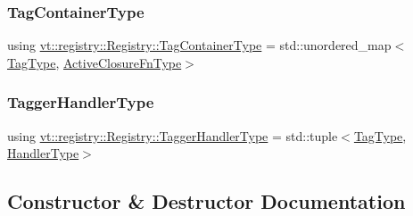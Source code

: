 \mbox{\label{structvt_1_1registry_1_1_registry_abefc9cdcc8557c5d547dd3ae44ae0996}} 
\subsubsection{\texorpdfstring{Tag\+Container\+Type}{TagContainerType}}
{\footnotesize\ttfamily using \hyperlink{structvt_1_1registry_1_1_registry_abefc9cdcc8557c5d547dd3ae44ae0996}{vt\+::registry\+::\+Registry\+::\+Tag\+Container\+Type} =  std\+::unordered\+\_\+map$<$\hyperlink{namespacevt_a84ab281dae04a52a4b243d6bf62d0e52}{Tag\+Type}, \hyperlink{namespacevt_a2a06c34cafcd511828f16cbf1476b924}{Active\+Closure\+Fn\+Type}$>$}

\mbox{\label{structvt_1_1registry_1_1_registry_aed8ec48ac909aea3e4dbc21aa6f8e898}} 
\subsubsection{\texorpdfstring{Tagger\+Handler\+Type}{TaggerHandlerType}}
{\footnotesize\ttfamily using \hyperlink{structvt_1_1registry_1_1_registry_aed8ec48ac909aea3e4dbc21aa6f8e898}{vt\+::registry\+::\+Registry\+::\+Tagger\+Handler\+Type} =  std\+::tuple$<$\hyperlink{namespacevt_a84ab281dae04a52a4b243d6bf62d0e52}{Tag\+Type}, \hyperlink{namespacevt_af64846b57dfcaf104da3ef6967917573}{Handler\+Type}$>$}



\subsection{Constructor \& Destructor Documentation}
\mbox{\label{structvt_1_1registry_1_1_registry_a319ac9c59641bee88d48e825a4840aa2}} 
